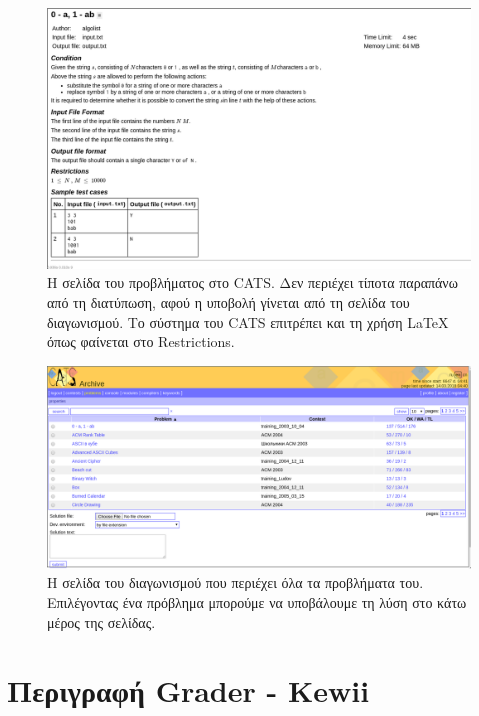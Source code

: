 \documentclass[diploma]{softlab-thesis}
\begin{document}
\FloatBarrier

\begin{figure}
  \centering
  \includegraphics[scale=0.45,trim=4 4 4 4,clip]{Figures/catsproblem.png}
  \caption[Διατύπωση προβλήματος CATS]{Η σελίδα του προβλήματος στο CATS. Δεν
  περιέχει τίποτα παραπάνω από τη διατύπωση, αφού η υποβολή γίνεται από τη σελίδα
  του διαγωνισμού. Το σύστημα του CATS επιτρέπει και τη χρήση LaTeX όπως
  φαίνεται στο Restrictions.}
\end{figure}

\begin{figure}
  \centering
  \includegraphics[scale=0.3,trim=4 4 4 4,clip]{Figures/catssubmission.png}
  \caption[Σελίδα διαγωνισμού και υποβολής CATS]{Η σελίδα του διαγωνισμού που
  περιέχει όλα τα προβλήματα του. Επιλέγοντας ένα πρόβλημα μπορούμε να υποβάλουμε
  τη λύση στο κάτω μέρος της σελίδας.}
\end{figure}


\chapter{Περιγραφή Grader - Kewii}
\end{document}
